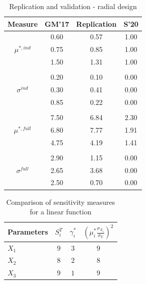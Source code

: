 \phantom{This text will be invisible} 
\hspace{5cm} %
\setlength{\tabcolsep}{12pt} %
\begin{table}[H]
	\centering
	\caption{Replication and validation - radial design}
	\label{tab:repval2}
	\renewcommand{\arraystretch}{1.2}%
	\begin{tabular}{cS[table-format=3.2]S[table-format=3.2]S[table-format=3.2]}
		\toprule
		{Measure}     & {GM'17}   & {Replication}  & {S'20} \\ 
		\midrule
		
		& 0.60  & 0.57         &  1.00 \\
		\qquad $\mu^{*,ind}$                               & 0.75  & 0.85         &  1.00 \\
		& 1.50  & 1.31         &  1.00 \\
		&&& \\
		& 0.20   & 0.10         &  0.00 \\
		\qquad $\sigma^{ind}$                            & 0.30   & 0.41         &  0.00 \\
		& 0.85  & 0.22         & 0.00 \\
		&&& \\
		& 7.50  & 6.84         &  2.30 \\
		\qquad $\mu^{*,full}$                              & 6.80   & 7.77         &  1.91 \\
		& 4.75  & 4.19         &  1.41 \\
		&&& \\
		& 2.90  & 1.15         &  0.00 \\
		\qquad $\sigma^{full}$                           & 2.65  & 3.68         &  0.00 \\
		& 2.50   & 0.70         &  0.00 \\ \bottomrule
	\end{tabular}
\end{table}

\newpage
\phantom{This text will be invisible} 
\vspace{10mm} %
\begin{table}[H]
	\centering
	\caption{Comparison of sensitivity measures for a linear function}
	\label{tab:bad-mu}
	\begin{tabular}{@{}lccc@{}}
		\toprule
		Parameters & $S_i^T$ & $\gamma_i^*$ & $(\mu_i^* \frac{\sigma_{X_i}}{\sigma_Y})^2$ \\ \midrule
		$X_1$ & $9$                       & $3$   & $9$   \\
		$X_2$ & $8$                       & $2$   & $8$   \\
		$X_3$ & $9$                       & $1$   & $9$   \\ \bottomrule
	\end{tabular}
\end{table}

